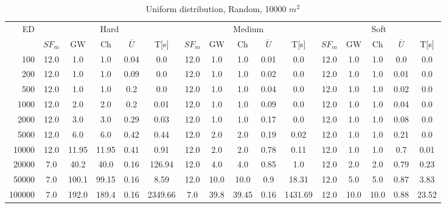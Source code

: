 \begin{table}[htb]
	\centering
	\begin{tabular}{|r|c|c|c|c|c|c|c|c|c|c|c|c|c|c|c|} 
		\hline
		\multirow{2}{*}{ED} & \multicolumn{5}{c|}{Hard} & \multicolumn{5}{c|}{Medium} &\multicolumn{5}{c|}{Soft} \\ 
		\cline{2-16} 
		&$SF_{m}$&GW & Ch & $\overline{U}$&T[s] &$SF_{m}$&GW & Ch & $\overline{U}$ &T[s] &$SF_{m}$&GW & Ch & $\overline{U}$  & T[s]  \\ 
		\hline 
		100 & 12.0 & 1.0 & 1.0 & 0.04 & 0.0 & 12.0 & 1.0 & 1.0 & 0.01 & 0.0 & 12.0 & 1.0 & 1.0 & 0.0 & 0.0\\ 
		200 & 12.0 & 1.0 & 1.0 & 0.09 & 0.0 & 12.0 & 1.0 & 1.0 & 0.02 & 0.0 & 12.0 & 1.0 & 1.0 & 0.01 & 0.0\\ 
		500 & 12.0 & 1.0 & 1.0 & 0.2 & 0.0 & 12.0 & 1.0 & 1.0 & 0.04 & 0.0 & 12.0 & 1.0 & 1.0 & 0.02 & 0.0\\ 
		1000 & 12.0 & 2.0 & 2.0 & 0.2 & 0.01 & 12.0 & 1.0 & 1.0 & 0.09 & 0.0 & 12.0 & 1.0 & 1.0 & 0.04 & 0.0\\ 
		2000 & 12.0 & 3.0 & 3.0 & 0.29 & 0.03 & 12.0 & 1.0 & 1.0 & 0.17 & 0.0 & 12.0 & 1.0 & 1.0 & 0.08 & 0.0\\ 
		5000 & 12.0 & 6.0 & 6.0 & 0.42 & 0.44 & 12.0 & 2.0 & 2.0 & 0.19 & 0.02 & 12.0 & 1.0 & 1.0 & 0.21 & 0.0\\ 
		10000 & 12.0 & 11.95 & 11.95 & 0.41 & 0.91 & 12.0 & 2.0 & 2.0 & 0.78 & 0.11 & 12.0 & 1.0 & 1.0 & 0.7 & 0.01\\ 
		20000 & 7.0 & 40.2 & 40.0 & 0.16 & 126.94 & 12.0 & 4.0 & 4.0 & 0.85 & 1.0 & 12.0 & 2.0 & 2.0 & 0.79 & 0.23\\ 
		50000 & 7.0 & 100.1 & 99.15 & 0.16 & 8.59 & 12.0 & 10.0 & 10.0 & 0.9 & 18.31 & 12.0 & 5.0 & 5.0 & 0.87 & 3.83\\ 
		100000 & 7.0 & 192.0 & 189.4 & 0.16 & 2349.66 & 7.0 & 39.8 & 39.45 & 0.16 & 1431.69 & 12.0 & 10.0 & 10.0 & 0.88 & 23.52\\ 
		\hline 
	\end{tabular} 
	\caption{Uniform distribution, Random, 10000 $m^2$} 
	\label{tab:UnRandom100} 
\end{table} 
